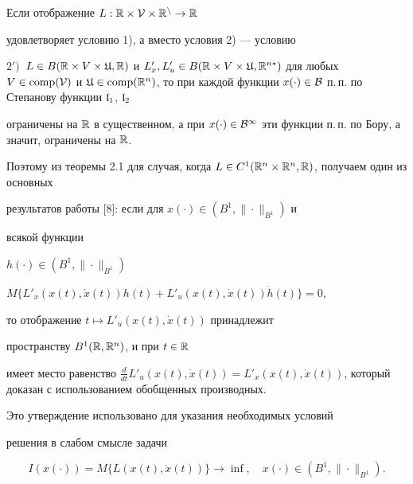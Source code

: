 \begin{notes}


Если отображение $L:\Bbb R\times\cal V\times\Bbb R^n\to\Bbb R$


удовлетворяет условию 1), а вместо условия 2) --- условию


$2')$~$L\in B(\Bbb R\times V\times\frak U,\Bbb


R)$ и $L'_x,L'_u\in B(\Bbb R\times V\times\frak


U,\Bbb R^{n*})$ для любых $V\in\comp(\cal V)$ и $\frak


U\in\comp(\Bbb R^n)$, то при каждой функции $x(\cdot)\in\cal


B$ п.\,п. по Степанову функции $\frak l_1$, $\frak l_2$


ограничены на $\Bbb R$ в существенном, а при $x(\cdot)\in\cal


B^1$ эти функции п.\,п. по Бору, а значит, ограничены на $\Bbb R$.


Поэтому из теоремы 2.1 для случая, когда $L\in C^1(\Bbb


R^n\times\Bbb R^n,\Bbb R)$, получаем один из основных


результатов работы [8]: если для $x(\cdot)\in(B^1,\|\cdot\|_{B^1})$ и


всякой функции


$h(\cdot)\in(B^1,\|\cdot\|_{B^1})$ \ 


$M\{L'_x(x(t),\Dot x(t))h(t)+L'_u(x(t),\Dot x(t))\Dot h(t)\}=0$,


то отображение $t\mapsto L'_u(x(t),\Dot x(t))$ принадлежит


пространству $B^1(\Bbb R,\Bbb R^n)$, и при $t\in\Bbb R$


имеет место равенство $\frac{d}{dt}L'_u(x(t),\Dot x(t))=


L'_x(x(t),\Dot x(t))$, который доказан с использованием обобщенных производных.




Это утверждение использовано для указания необходимых условий


решения в слабом смысле задачи


\begin{equation}


I(x(\cdot))=M\{L(x(t),\dot x(t))\}\to\inf,\quad


x(\cdot)\in(B^1,\|\cdot\|_{B^1}).


\end{equation}


\end{notes}





